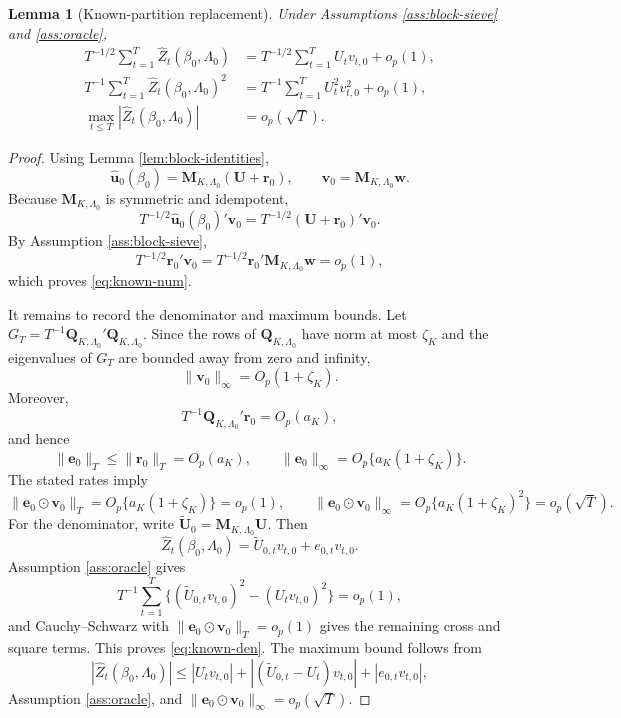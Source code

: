 \documentclass[12pt]{article}
\numberwithin{equation}{section}
\newtheorem{lemma}{Lemma}
\theoremstyle{definition}
\begin{document}
\begin{lemma}[Known-partition replacement]
\label{lem:known-replacement}
Under Assumptions \ref{ass:block-sieve} and \ref{ass:oracle},
\begin{align}
    T^{-1/2}\sum_{t=1}^T\widehat Z_t(\beta_0,\Lambda_0)
    &=T^{-1/2}\sum_{t=1}^T U_tv_{t,0}+o_p(1),
    \label{eq:known-num}\\
    T^{-1}\sum_{t=1}^T\widehat Z_t(\beta_0,\Lambda_0)^2
    &=T^{-1}\sum_{t=1}^T U_t^2v_{t,0}^2+o_p(1),
    \label{eq:known-den}\\
    \max_{t\leq T}|\widehat Z_t(\beta_0,\Lambda_0)|&=o_p(\sqrt T).
    \label{eq:known-max}
\end{align}
\end{lemma}

\begin{proof}
Using Lemma \ref{lem:block-identities},
\[
    \widehat{\bm u}_0(\beta_0)
    =
    \bm M_{K,\Lambda_0}(\bm U+\bm r_0),
    \qquad
    \bm v_0=\bm M_{K,\Lambda_0}\bm w.
\]
Because \(\bm M_{K,\Lambda_0}\) is symmetric and idempotent,
\[
    T^{-1/2}\widehat{\bm u}_0(\beta_0)'\bm v_0
    =
    T^{-1/2}(\bm U+\bm r_0)'\bm v_0.
\]
By Assumption \ref{ass:block-sieve},
\[
    T^{-1/2}\bm r_0'\bm v_0
    =
    T^{-1/2}\bm r_0'\bm M_{K,\Lambda_0}\bm w
    =o_p(1),
\]
which proves \eqref{eq:known-num}.

It remains to record the denominator and maximum bounds. Let \(G_T=T^{-1}\bm Q_{K,\Lambda_0}'\bm Q_{K,\Lambda_0}\). Since the rows of \(\bm Q_{K,\Lambda_0}\) have norm at most \(\zeta_K\) and the eigenvalues of \(G_T\) are bounded away from zero and infinity,
\[
    \|\bm v_0\|_\infty=O_p(1+\zeta_K).
\]
Moreover,
\[
    T^{-1}\bm Q_{K,\Lambda_0}'\bm r_0=O_p(a_K),
\]
and hence
\[
    \|\bm e_0\|_T\leq\|\bm r_0\|_T=O_p(a_K),
    \qquad
    \|\bm e_0\|_\infty=O_p\{a_K(1+\zeta_K)\}.
\]
The stated rates imply
\[
    \|\bm e_0\odot\bm v_0\|_T
    =O_p\{a_K(1+\zeta_K)\}=o_p(1),
    \qquad
    \|\bm e_0\odot\bm v_0\|_\infty
    =O_p\{a_K(1+\zeta_K)^2\}=o_p(\sqrt T).
\]
For the denominator, write \(\widetilde{\bm U}_0=\bm M_{K,\Lambda_0}\bm U\). Then
\[
    \widehat Z_t(\beta_0,\Lambda_0)
    =
    \widetilde U_{0,t}v_{t,0}+e_{0,t}v_{t,0}.
\]
Assumption \ref{ass:oracle} gives
\[
    T^{-1}\sum_{t=1}^T
    \{(\widetilde U_{0,t}v_{t,0})^2-(U_tv_{t,0})^2\}=o_p(1),
\]
and Cauchy--Schwarz with \(\|\bm e_0\odot\bm v_0\|_T=o_p(1)\) gives the remaining cross and square terms. This proves \eqref{eq:known-den}. The maximum bound follows from
\[
    |\widehat Z_t(\beta_0,\Lambda_0)|
    \leq
    |U_tv_{t,0}|
    +
    |(\widetilde U_{0,t}-U_t)v_{t,0}|
    +
    |e_{0,t}v_{t,0}|,
\]
Assumption \ref{ass:oracle}, and \(\|\bm e_0\odot\bm v_0\|_\infty=o_p(\sqrt T)\).
\end{proof}
\end{document}
